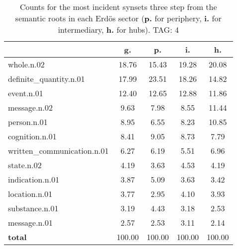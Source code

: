 \begin{table}[h!]
\begin{center}
\begin{tabular}{| l || c | c | c | c |}\hline
 & {\bf g.} & {\bf p.} & {\bf i.} & {\bf h.} \\\hline\hline
whole.n.02 & 18.76  & 15.43  & 19.28  & 20.08 \\\hline
definite\_quantity.n.01 & 17.99  & 23.51  & 18.26  & 14.82 \\\hline
event.n.01 & 12.40  & 12.65  & 12.88  & 11.86 \\\hline
message.n.02 & 9.63  & 7.98  & 8.55  & 11.44 \\\hline
person.n.01 & 8.95  & 6.55  & 8.23  & 10.85 \\\hline
cognition.n.01 & 8.41  & 9.05  & 8.73  & 7.79 \\\hline
written\_communication.n.01 & 6.27  & 6.19  & 5.51  & 6.96 \\\hline
state.n.02 & 4.19  & 3.63  & 4.53  & 4.19 \\\hline
indication.n.01 & 3.87  & 5.09  & 3.63  & 3.42 \\\hline
location.n.01 & 3.77  & 2.95  & 4.10  & 3.93 \\\hline
substance.n.01 & 3.19  & 4.43  & 3.18  & 2.53 \\\hline
message.n.01 & 2.57  & 2.53  & 3.11  & 2.14 \\\hline\hline
{{\bf total}} & 100.00  & 100.00  & 100.00  & 100.00 \\\hline
\end{tabular}
\caption{Counts for the most incident synsets three step from the semantic roots in each Erd\"os sector ({\bf p.} for periphery, {\bf i.} for intermediary, {\bf h.} for hubs). TAG: 4}
\end{center}
\end{table}